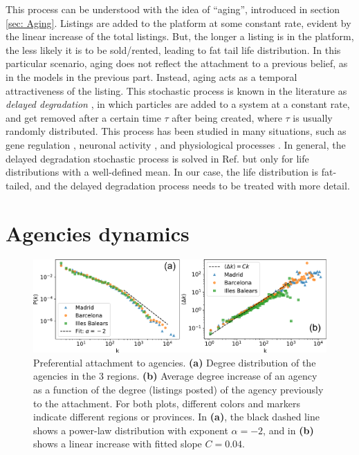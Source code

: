 This process can be understood with the idea of ``aging'', introduced in section \ref{sec: Aging}. Listings are added to the platform at some constant rate, evident by the linear increase of the total listings. But, the longer a listing is in the platform, the less likely it is to be sold/rented, leading to fat tail life distribution. In this particular scenario, aging does not reflect the attachment to a previous belief, as in the models in the previous part. Instead, aging acts as a temporal attractiveness of the listing. This stochastic process is known in the literature as \textit{delayed degradation} \cite{lafuerza2013stochastic}, in which particles are added to a system at a constant rate, and get removed after a certain time $\tau$ after being created, where $\tau$ is usually randomly distributed. This process has been studied in many situations, such as gene regulation \cite{lewis2003autoinhibition, barrio2006oscillatory, bratsun2005delay}, neuronal activity \cite{flunkert2013dynamics}, and physiological processes \cite{longtin1990noise}. In general, the delayed degradation stochastic process is solved in Ref. \cite{lafuerza2013stochastic} but only for life distributions with a well-defined mean. In our case, the life distribution is fat-tailed, and the delayed degradation process needs to be treated with more detail.

\section{Agencies dynamics}

\begin{figure}
    \centering
    \includegraphics[width =\textwidth]{Figs/Idealista_dynamics/panel_degree.pdf}
	\caption[Preferential attachment to agencies.]{\label{fig:panel_degree}Preferential attachment to agencies. \textbf{(a)} Degree distribution of the agencies in the 3 regions. \textbf{(b)} Average degree increase of an agency as a function of the degree (listings posted) of the agency previously to the attachment. For both plots, different colors and markers indicate different regions or provinces. In \textbf{(a)}, the black dashed line shows a power-law distribution with exponent $\alpha  =-2$, and in \textbf{(b)} shows a linear increase with fitted slope $C = 0.04$.}
\end{figure}

